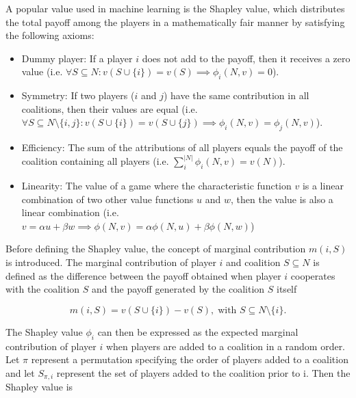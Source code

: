 A popular value used in machine learning is the Shapley value, which distributes
the total payoff among the players in a mathematically fair manner by satisfying the
following axioms:\cite{merrick2020explanation, shapley1953value}


\begin{itemize}
	\item Dummy player: If a player $i$ does not add to the payoff, then it receives a
	      zero value (i.e. $\forall S \subseteq N: v(S \cup \{i\}) = v(S) \implies \phi_i(N, v) = 0$).

	\item Symmetry: If two players ($i$ and $j$) have the same contribution in all coalitions, then
	      their values are equal (i.e. $\forall S \subseteq N \setminus \{i, j\}: v(S \cup \{i\}) = v(S \cup \{j\}) \implies \phi_i(N, v) = \phi_j(N, v)$).

	\item Efficiency: The sum of the attributions of all players equals the payoff of the coalition containing
	      all players (i.e. $\sum^{|N|}_i \phi_i(N, v) = v(N)$).

	\item Linearity: The value of a game where the characteristic function $v$ is a linear combination of
	      two other value functions $u$ and $w$, then the value is also a linear combination (i.e.
	      $v = \alpha u + \beta w \implies \phi(N, v) = \alpha \phi(N, u) + \beta \phi(N, w)$)
\end{itemize}


Before defining the Shapley value, the concept of marginal contribution $m(i, S)$ is 
introduced. The marginal contribution of player $i$ and coalition $S \subseteq N$ is defined as the 
difference between the payoff obtained when player $i$ cooperates with the coalition 
$S$ and the payoff generated by the coalition $S$ itself\cite{shapley1953value}


\begin{equation}
	m(i, S) = v\left(S \cup \{i\}\right) - v\left(S\right), \; \text{with } S \subseteq N \setminus \{i\}.
\end{equation}


The Shapley value $\phi_i$ can then be expressed as the expected marginal 
contribution of player $i$ when players are added to a coalition in a 
random order. Let $\pi$ represent a permutation specifying the order 
of players added to a coalition and let $S_{\pi, i}$ represent the set of players 
added to the coalition prior to i. Then the Shapley value is\cite{merrick2020explanation} 


